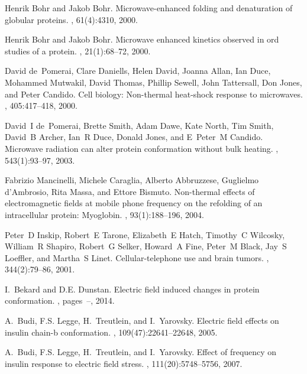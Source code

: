 \documentclass[journal=jctcce,manuscript=article]{achemso}
\begin{document}
\begin{thebibliography}{10}

Henrik Bohr and Jakob Bohr.
\newblock Microwave-enhanced folding and denaturation of globular proteins.
, 61(4):4310, 2000.

Henrik Bohr and Jakob Bohr.
\newblock Microwave enhanced kinetics observed in ord studies of a protein.
, 21(1):68--72, 2000.

David de~Pomerai, Clare Daniells, Helen David, Joanna Allan, Ian Duce, Mohammed
  Mutwakil, David Thomas, Phillip Sewell, John Tattersall, Don Jones, and Peter
  Candido.
\newblock Cell biology: Non-thermal heat-shock response to microwaves.
, 405:417--418, 2000.

David~I de~Pomerai, Brette Smith, Adam Dawe, Kate North, Tim Smith, David~B
  Archer, Ian~R Duce, Donald Jones, and E~Peter~M Candido.
\newblock Microwave radiation can alter protein conformation without bulk
  heating.
, 543(1):93--97, 2003.

Fabrizio Mancinelli, Michele Caraglia, Alberto Abbruzzese, Guglielmo
  d'Ambrosio, Rita Massa, and Ettore Bismuto.
\newblock Non-thermal effects of electromagnetic fields at mobile phone
  frequency on the refolding of an intracellular protein: Myoglobin.
, 93(1):188--196, 2004.

Peter~D Inskip, Robert~E Tarone, Elizabeth~E Hatch, Timothy~C Wilcosky,
  William~R Shapiro, Robert~G Selker, Howard~A Fine, Peter~M Black, Jay~S
  Loeffler, and Martha~S Linet.
\newblock Cellular-telephone use and brain tumors.
, 344(2):79--86, 2001.

I.~Bekard and D.E. Dunstan.
\newblock Electric field induced changes in protein conformation.
, pages~--, 2014.

A.~Budi, F.S. Legge, H.~Treutlein, and I.~Yarovsky.
\newblock Electric field effects on insulin chain-b conformation.
, 109(47):22641--22648, 2005.

A.~Budi, F.S. Legge, H.~Treutlein, and I.~Yarovsky.
\newblock Effect of frequency on insulin response to electric field stress.
, 111(20):5748--5756, 2007.


\end{thebibliography}
\end{document}
